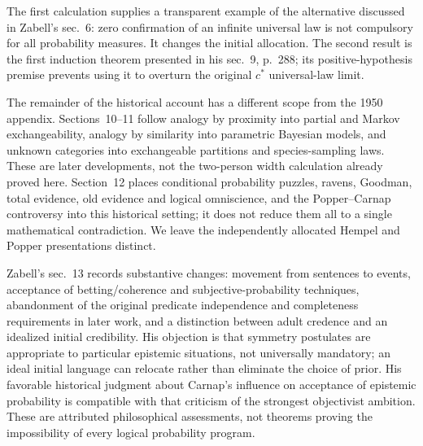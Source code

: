 The first calculation supplies a transparent example of the alternative
discussed in Zabell's sec.~6: zero confirmation of an infinite universal
law is not compulsory for all probability measures. It changes the
initial allocation. The second result is the first induction theorem
presented in his sec.~9, p.~288; its positive-hypothesis premise prevents
using it to overturn the original \(c^*\) universal-law limit.

The remainder of the historical account has a different scope from the
1950 appendix. Sections~10--11 follow analogy by proximity into partial
and Markov exchangeability, analogy by similarity into parametric
Bayesian models, and unknown categories into exchangeable partitions and
species-sampling laws. These are later developments, not the two-person
width calculation already proved here. Section~12 places conditional
probability puzzles, ravens, Goodman, total evidence, old evidence and
logical omniscience, and the Popper--Carnap controversy into this
historical setting; it does not reduce them all to a single mathematical
contradiction. We leave the independently allocated Hempel and Popper
presentations distinct.

Zabell's sec.~13 records substantive changes: movement from sentences
to events, acceptance of betting/coherence and subjective-probability
techniques, abandonment of the original predicate independence and
completeness requirements in later work, and a distinction between adult
credence and an idealized initial credibility. His objection is that
symmetry postulates are appropriate to particular epistemic situations,
not universally mandatory; an ideal initial language can relocate rather
than eliminate the choice of prior. His favorable historical judgment
about Carnap's influence on acceptance of epistemic probability is
compatible with that criticism of the strongest objectivist ambition.
These are attributed philosophical assessments, not theorems proving
the impossibility of every logical probability program.

